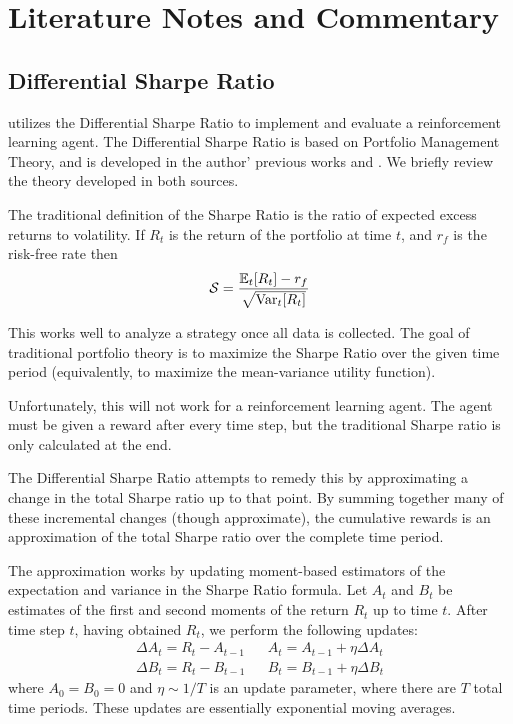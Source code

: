 \chapter{Literature Notes and Commentary}

\section{Differential Sharpe Ratio}

\cite{drl_mvo} utilizes the Differential Sharpe Ratio to implement and evaluate a reinforcement learning agent.
The Differential Sharpe Ratio is based on Portfolio Management Theory, and is developed in the author' previous works \cite{diff_sharpe_ratio_paper} and \cite{diff_sharpe_ratio_book}.
We briefly review the theory developed in both sources.

The traditional definition of the Sharpe Ratio is the ratio of expected excess returns to volatility.
If $R_t$ is the return of the portfolio at time $t$, and $r_f$ is the risk-free rate then
\begin{align*}
  \mathcal{S} = \frac{\mathbb{E}_t[R_t] - r_f}{\sqrt{\operatorname{Var}_t[R_t]}}
\end{align*}

This works well to analyze a strategy once all data is collected.
The goal of traditional portfolio theory is to maximize the Sharpe Ratio over the given time period (equivalently,
to maximize the mean-variance utility function).

Unfortunately, this will not work for a reinforcement learning agent. The agent must be given a reward after every time step,
but the traditional Sharpe ratio is only calculated at the end.

The Differential Sharpe Ratio attempts to remedy this by approximating a change in the total Sharpe ratio up to that point.
By summing together many of these incremental changes (though approximate), the cumulative rewards is an approximation of the total
Sharpe ratio over the complete time period.

The approximation works by updating moment-based estimators of the expectation and variance in the Sharpe Ratio formula.
Let $A_t$ and $B_t$ be estimates of the first and second moments of the return $R_t$ up to time $t$.
After time step $t$, having obtained $R_t$, we perform the following updates:
\begin{align*}
  \Delta A_t = R_t - A_{t-1} && A_t = A_{t-1} + \eta \Delta A_t \\
  \Delta B_t = R_t - B_{t-1} && B_t = B_{t-1} + \eta \Delta B_t
\end{align*}
where $A_0 = B_0 = 0$ and $\eta \sim 1/T$ is an update parameter, where there are $T$ total time periods.
These updates are essentially exponential moving averages.

